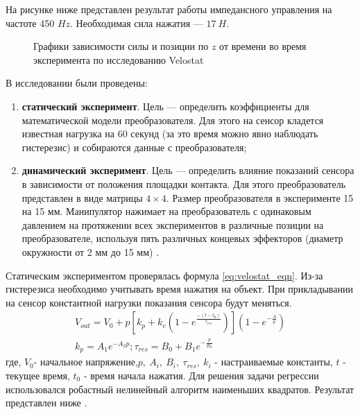 На рисунке ниже  представлен результат работы импедансного управления на частоте 450 $Hz$. Необходимая сила нажатия --- $17\ H$.
\begin{figure}[h]
        \centering
        \caption{Графики зависимости силы и позиции по $z$ от времени во время эксперимента по исследованию Velostat}
        \label{fig:force_data_pos.png}
    \end{figure}

В исследовании были проведены:
\begin{enumerate}
    \item \textbf{статический эксперимент}. Цель — определить коэффициенты для математической модели преобразователя. Для этого на сенсор кладется известная нагрузка на 60 секунд (за это время можно явно наблюдать гистерезис) и собираются данные с преобразователя;
          \item\textbf{динамический эксперимент}. Цель — определить влияние показаний сенсора в зависимости от положения площадки контакта. Для этого преобразователь представлен в виде матрицы $4 \times 4$. Размер преобразователя в эксперименте 15 на 15 мм. Манипулятор нажимает на преобразователь с одинаковым давлением на протяжении всех экспериментов в различные позиции на преобразователе, используя пять различных концевых эффекторов (диаметр окружности от 2 мм до 15 мм) .
\end{enumerate}

Статическим экспериментом проверялась формула \eqref{eq:velostat_eqn}. Из-за гистерезиса необходимо учитывать время нажатия на объект. При прикладывании на сенсор константной нагрузки показания сенсора будут меняться.
\begin{eqnarray}
    \label{eq:velostat_eqn}
    V_{out} = V_0 + p[k_p + k_e(1-e^\frac{-(t-t_0)}{\tau_{res}})](1-e^{-\frac{A}{p}}) \\
    k_p = A_1e^{-A_2p}; \tau_{res} = B_0 + B_1e^{-\frac{p}{B_2}}
\end{eqnarray}
где,  $V_0$- начальное напряжение,$p,\ A_i,\ B_i,\ \tau_{res},\ k_i$  - настраиваемые константы, $t$ - текущее время, $t_0$ - время начала нажатия.
Для решения задачи регрессии использовался робастный нелинейный алгоритм наименьших квадратов. Результат представлен ниже .

